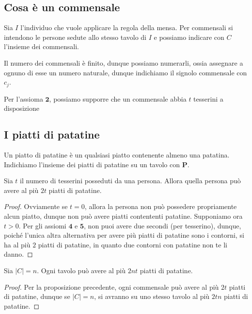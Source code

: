 \documentclass[a4paper,12pt]{article}
\begin{document}
    \subsection{Cosa è un commensale}
    \begin{definizione}
        Sia $I$ l'individuo che vuole applicare la regola della mensa. Per commensali si intendono le persone sedute allo stesso tavolo di $I$ e possiamo indicare con $C$ l'insieme dei commensali.
    \end{definizione}
    \begin{osservazione}
        Il numero dei commensali è finito, dunque possiamo numerarli, ossia assegnare a ognuno di esse un numero naturale, dunque indichiamo il signolo commensale con $c_j$.
    \end{osservazione}
    \begin{osservazione}
        Per l'assioma $\mathbf{2}$, possiamo supporre che un commensale abbia $t$ tesserini a disposizione    
    \end{osservazione}
    \subsection{I piatti di patatine}
    \begin{definizione}
        Un piatto di patatine è un qualsiasi piatto contenente almeno una patatina. Indichiamo l'insieme dei piatti di patatine su un tavolo con $\mathbf{P}$.
    \end{definizione}
    \begin{proposizione}
       Sia $t$ il numero di tesserini posseduti da una persona. Allora quella persona può avere al più $2t$ piatti di patatine.
    \end{proposizione}
    \begin{proof}
        Ovviamente se $t=0$, allora la persona non può possedere propriamente alcun piatto, dunque non può avere piatti contententi patatine.
        Supponiamo ora $t>0$. Per gli assiomi $\mathbf{4}$ e $\mathbf{5}$, non puoi avere due secondi (per tesserino), dunque, poiché l'unica altra alternativa per avere più piatti di patatine sono i contorni, si ha al più $2$ piatti di patatine, in quanto due contorni con patatine non te li danno.
    \end{proof}
    \begin{corollario}
        Sia $|C|=n$. Ogni tavolo può avere al più $2nt$ piatti di patatine.
    \end{corollario}
    \begin{proof}
        Per la proposizione precedente, ogni commensale può avere al più $2t$ piatti di patatine, dunque se $|C|=n$, si avranno su uno stesso tavolo al più $2tn$ piatti di patatine. 
    \end{proof}
    \newpage
\end{document}
